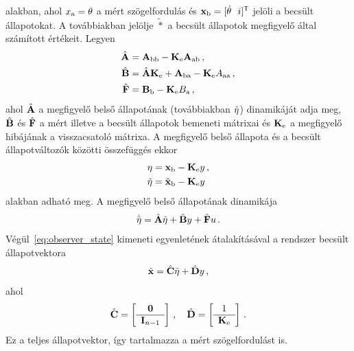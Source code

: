 alakban, ahol $x_{\mathrm{a}} = \theta$ a mért szögelfordulás és 
$\mathbf{x}_{\mathrm{b}} = [\dot \theta~~i]^{\mathsf T}$ jelöli a becsült állapotokat.
A továbbiakban jelölje $\tilde{*}$ a becsült állapotok megfigyelő által számított értékeit. Legyen
\begin{align}\label{eq:observer_params}
    \begin{split}
    \hat{\mathbf{A}} &= \mathbf{A}_{\mathrm{bb}} - \mathbf{K}_{\mathrm{e}} \mathbf{A}_{\mathrm{ab}}\,,\\
    \hat{\mathbf{B}} &= \hat{\mathbf{A}} \mathbf{K}_{\mathrm{e}} + \mathbf{A}_{\mathrm{ba}} - \mathbf{K}_{\mathrm{e}} A_{\mathrm{aa}}\,,\\
    \hat{\mathbf{F}} &= \mathbf{B}_{\mathrm{b}} - \mathbf{K}_{\mathrm{e}} B_{\mathrm{a}}\,,
    \end{split}
\end{align}
ahol $\hat{\mathbf{A}}$ a megfigyelő belső állapotának (továbbiakban $\tilde{\mathbf{\eta}}$) 
dinamikáját adja meg, $\hat{\mathbf{B}}$ és $\hat{\mathbf{F}}$ a mért illetve a becsült állapotok 
bemeneti mátrixai és $\mathbf{K}_{\mathrm{e}}$ a megfigyelő hibájának a visszacsatoló mátrixa. 
A megfigyelő belső állapota és a becsült állapotváltozók közötti összefüggés ekkor
\begin{align}
    \begin{split}
    \mathbf{\eta} &= \mathbf{x}_{\mathrm{b}} - \mathbf{K}_{\mathrm{e}} y\,,\\
    \tilde{\mathbf{\eta}} &= \tilde{\mathbf{x}}_{\mathrm{b}} - \mathbf{K}_{\mathrm{e}} y
    \end{split}
\end{align}
alakban adható meg. A megfigyelő belső állapotának dinamikája
\begin{align}
    \begin{split}
    \dot{\tilde{\mathbf{\eta}}} = \hat{\mathbf{A}} \tilde{\mathbf{\eta}} + \hat{\mathbf{B}} y + \hat{\mathbf{F}} u\,.
    \end{split}
\end{align}
Végül~\eqref{eq:observer_state} kimeneti egyenletének átalakításával a rendszer becsült állapotvektora
\begin{align}
    \tilde{\mathbf{x}} = \hat{\mathbf{C}} \tilde{\mathbf{\eta}} + \hat{\mathbf{D}} y\,,
\end{align}
ahol
\begin{align}
    \hat{\mathbf{C}} = 
    \left[\begin{array}{c}
        \mathbf{0} \\ \hline
        \mathbf{I}_{n-1}
    \end{array}\right]\,,
    \quad
    \hat{\mathbf{D}} = 
    \left[\begin{array}{c}
        1 \\ \hline
        \mathbf{K}_{\mathrm{e}}
    \end{array}\right]\,.
\end{align}
Ez a teljes állapotvektor, így tartalmazza a mért szögelfordulást is.

